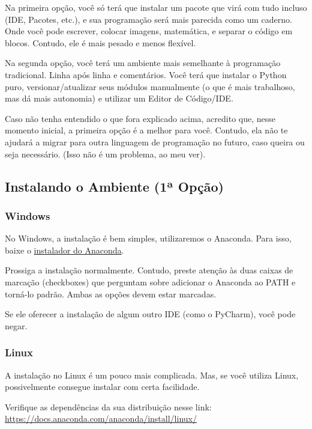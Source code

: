 \documentclass[11pt, brazilian]{article}
\begin{document}
Na primeira opção, você só terá que instalar um pacote que virá com tudo
incluso (IDE, Pacotes, etc.), e sua programação será mais parecida como
um caderno. Onde você pode escrever, colocar imagens, matemática, e
separar o código em blocos. Contudo, ele é mais pesado e menos flexível.

Na segunda opção, você terá um ambiente mais semelhante à programação
tradicional. Linha após linha e comentários. Você terá que instalar o
Python puro, versionar/atualizar seus módulos manualmente (o que é mais
trabalhoso, mas dá mais autonomia) e utilizar um Editor de Código/IDE.

Caso não tenha entendido o que fora explicado acima, acredito que, nesse
momento inicial, a primeira opção é a melhor para você. Contudo, ela não
te ajudará a migrar para outra linguagem de programação no futuro, caso
queira ou seja necessário. (Isso não é um problema, ao meu ver).

\hypertarget{instalando-o-ambiente-1uxaa-opuxe7uxe3o}{%
\subsection{Instalando o Ambiente (1ª
Opção)}\label{instalando-o-ambiente-1uxaa-opuxe7uxe3o}}

\hypertarget{windows}{%
\subsubsection{Windows}\label{windows}}

No Windows, a instalação é bem simples, utilizaremos o Anaconda. Para
isso, baixe o
\href{https://www.anaconda.com/download/\#windows}{instalador do
Anaconda}.

Prossiga a instalação normalmente. Contudo, preste atenção às duas
caixas de marcação (checkboxes) que perguntam sobre adicionar o Anaconda
ao PATH e torná-lo padrão. Ambas as opções devem estar marcadas.

Se ele oferecer a instalação de algum outro IDE (como o PyCharm), você
pode negar.

\hypertarget{linux}{%
\subsubsection{Linux}\label{linux}}

A instalação no Linux é um pouco mais complicada. Mas, se você utiliza
Linux, possivelmente consegue instalar com certa facilidade.

Verifique as dependências da sua distribuição nesse link:
\url{https://docs.anaconda.com/anaconda/install/linux/}
\end{document}
